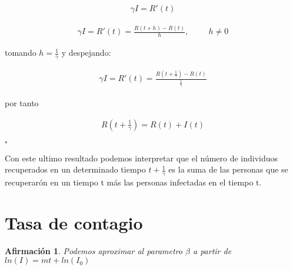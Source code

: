 \documentclass[a4paper,openany,12pt]{book}
\newtheorem{Af}{Afirmación}
\begin{document}
\begin{Dem}
\begin{align*}
\gamma I = R'(t)
\end{align*}

\begin{align*}
\gamma I = R'(t) = \frac{R\left( t + h \right) - R\left(t\right)}{h}, \hspace{1cm} h \neq 0
\end{align*}

tomando $h = \frac{1}{\gamma}$ y despejando: 

\begin{align*}
\gamma I = R'(t) = \frac{R\left( t + \frac{1}{\gamma} \right) - R\left(t\right)}{\frac{1}{\gamma}}
\end{align*}

por tanto

\begin{align*}
R\left( t + \frac{1}{\gamma} \right) = R(t) + I(t)
\end{align*}

\hfill	$\square$
\end{Dem}

Con este ultimo resultado podemos interpretar que el número de individuos recuperados en un determinado tiempo $t + \frac {1}{\gamma}$  es la suma de las personas que se recuperarón en un tiempo t más las personas infectadas en el tiempo t.

\newpage

\section{Tasa de contagio}

\begin{Af}
Podemos aproximar al parametro $\beta$ a partir de $ln(I) = mt + ln(I_{0})$ \cite{Algeria}
\end{Af}
\end{document}
